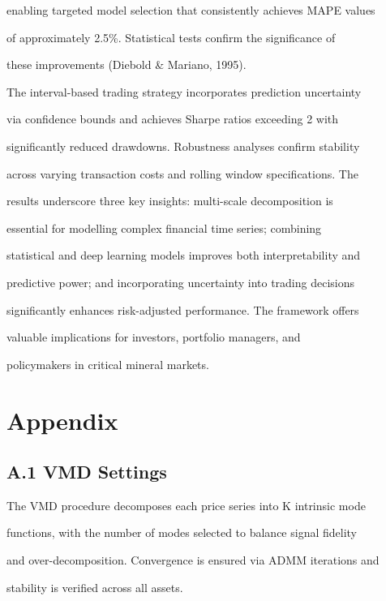 enabling targeted model selection that consistently achieves MAPE values

of approximately 2.5\%. Statistical tests confirm the significance of

these improvements (Diebold \& Mariano, 1995).



The interval-based trading strategy incorporates prediction uncertainty

via confidence bounds and achieves Sharpe ratios exceeding 2 with

significantly reduced drawdowns. Robustness analyses confirm stability

across varying transaction costs and rolling window specifications. The

results underscore three key insights: multi-scale decomposition is

essential for modelling complex financial time series; combining

statistical and deep learning models improves both interpretability and

predictive power; and incorporating uncertainty into trading decisions

significantly enhances risk-adjusted performance. The framework offers

valuable implications for investors, portfolio managers, and

policymakers in critical mineral markets.



\section{Appendix}\label{appendix}



\subsection{A.1 VMD Settings}\label{a.1-vmd-settings}



The VMD procedure decomposes each price series into K intrinsic mode

functions, with the number of modes selected to balance signal fidelity

and over-decomposition. Convergence is ensured via ADMM iterations and

stability is verified across all assets.



